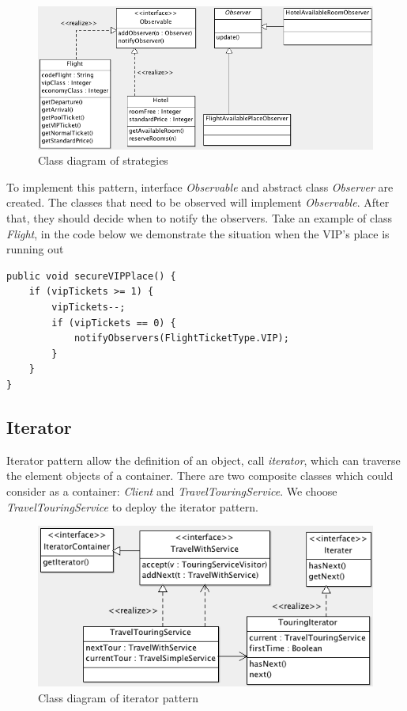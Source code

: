 \begin{figure}[h]
\centering
\includegraphics[width=12cm]{project/images/observer.png}
\caption{Class diagram of strategies}
\end{figure}

To implement this pattern, interface \textit{Observable} and abstract class \textit{Observer} are created. The classes that need to be observed will implement \textit{Observable}. After that, they should decide when to notify the observers. Take an example of class \textit{Flight}, in the code below we demonstrate the situation when the VIP's place is running out

\begin{lstlisting}
public void secureVIPPlace() {
	if (vipTickets >= 1) {
		vipTickets--;
		if (vipTickets == 0) {
			notifyObservers(FlightTicketType.VIP);
		}
	}
}
\end{lstlisting}

\newpage
\subsection{Iterator}
Iterator pattern allow the definition of an object, call \textit{iterator}, which can traverse the element objects of a container. There are two composite classes which could consider as a container: \textit{Client} and \textit{TravelTouringService}. We choose \textit{TravelTouringService} to deploy the iterator pattern. 

\begin{figure}[h]
\centering
\includegraphics[width=12cm]{project/images/iterator.png}
\caption{Class diagram of iterator pattern}
\end{figure}

